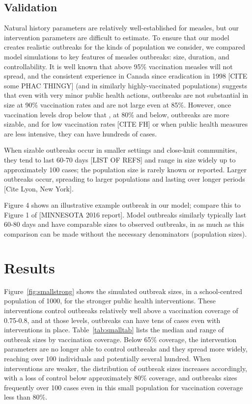 \documentclass[12pt,a4paper]{article}
\begin{document}
\subsection{Validation}
Natural history parameters are relatively well-established for measles, but our intervention parameters are difficult to estimate. To ensure that our model creates realistic outbreaks for the kinds of population we consider, we compared model simulations to key features of measles outbreaks: size, duration, and controllability. It is well known that above 95\% vaccination measles will not spread, and the consistent experience in Canada since eradication in 1998 [CITE some PHAC THINGY] (and in similarly highly-vaccinated populations) suggests that even with very minor public health actions, outbreaks are not substantial in size at 90\% vaccination rates and are not large even at 85\%. However, once vaccination levels drop below that , at 80\% and below, outbreaks are more sizable, and for low vaccination rates [CITE FH] or when public health measures are less intensive, they can have hundreds of cases.

When sizable outbreaks occur in smaller settings and close-knit communities, they tend to last 60-70 days [LIST OF REFS] and range in size widely up to approximately 100 cases; the population size is rarely known or reported. Larger outbreaks occur, spreading to larger populations and lasting over longer periods [Cite Lyon, New York].

Figure 4 shows an illustrative example outbreak in our model; compare this to Figure 1 of [MINNESOTA 2016 report].
Model outbreaks similarly typically last 60-80 days and have comparable sizes to observed outbreaks, in as much as this comparison can be made without the necessary denominators (population sizes).


\section{Results}

Figure~\ref{fig:smallstrong} shows the simulated outbreak sizes, in a school-centred population of 1000, for the stronger public health interventions. These  interventions control outbreaks relatively well above a vaccination coverage of 0.75-0.8, and at those levels, outbreaks can have tens of cases even with interventions in place. Table~\ref{tab:smalltab} lists the median and range of outbreak sizes by vaccination coverage. Below 65\% coverage, the intervention parameters are no longer able to control outbreaks and they spread more widely, reaching over 100 individuals and potentially several hundred. When interventions are weaker, the distribution of outbreak sizes increases accordingly, with a loss of control below approximately 80\% coverage, and outbreaks sizes frequently over 100 cases even in this small population for vaccination coverage less than 80\%. 
\end{document}
